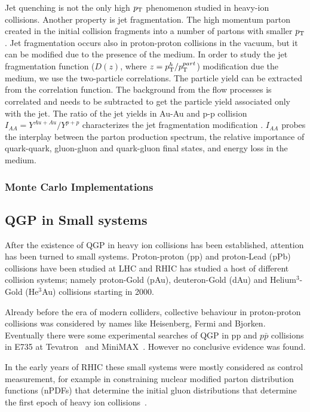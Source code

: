 Jet quenching is not the only high $p_{\rm T}$ phenomenon studied in heavy-ion collisions. Another property is jet fragmentation. The high momentum parton created in the initial collision fragments into a number of partons with smaller $p_{\rm T}$. Jet fragmentation occurs also in proton-proton collisions in the vacuum, but it can be modified due to the presence of the medium. In order to study the jet fragmentation function ($D(z)$, where $z= p_{\rm T}^h/p_{\rm T}^{part}$) modification due the medium, we use the two-particle correlations. The particle yield can be extracted from the correlation function. The background from the flow processes is correlated and needs to be subtracted to get the particle yield associated only with the jet. The ratio of the jet yields in Au-Au and p-p collision $I_{AA} = {Y^{Au+Au}}/{Y^{p+p}}$ characterizes the jet fragmentation modification \cite{Aamodt:2011vg}. $I_{AA}$ probes the interplay between the parton production spectrum, the relative importance of quark-quark, gluon-gluon and quark-gluon final states, and energy loss in the medium.
\subsubsection{Monte Carlo Implementations}


\subsection{QGP in Small systems}
After the existence of QGP in heavy ion collisions has been established, attention has been turned to small systems. Proton-proton (pp) and proton-Lead (pPb) collisions have been studied at LHC and RHIC has studied a host of different collision systems; namely proton-Gold (pAu), deuteron-Gold (dAu) and Helium$^3$-Gold (He$^3$Au) collisions starting in 2000. %

Already before the era of modern colliders, collective behaviour in proton-proton collisions was considered by names like Heisenberg, Fermi and Bjorken.~\cite{Nagle:2018nvi} Eventually there were some experimental searches of QGP in pp and $p\bar p$ collisions in E735 at Tevatron~\cite{Alexopoulos:1993wt} and MiniMAX~\cite{Brooks:1999xy}. However no conclusive evidence was found. 

In the early years of RHIC these small systems were mostly considered as control measurement, for example in constraining nuclear modified parton distribution functions (nPDFs) that determine the initial gluon distributions that determine the first epoch
of heavy ion collisions~\cite{Shen:2015qta, Adare:2015lcd}. 

